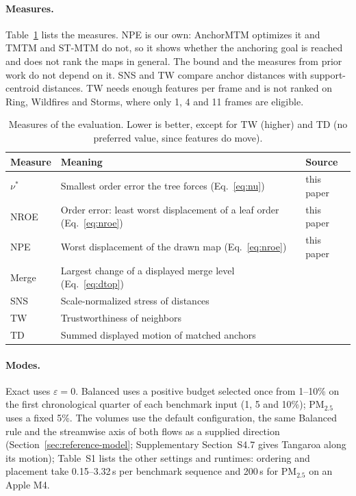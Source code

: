 \paragraph{Measures.} Table~\ref{tab:measures} lists the measures. NPE is our own: AnchorMTM optimizes it and TMTM and ST-MTM do not, so it shows whether the anchoring goal is reached and does not rank the maps in general. The bound and the measures from prior work do not depend on it. SNS and TW compare anchor distances with support-centroid distances. TW needs enough features per frame and is not ranked on Ring, Wildfires and Storms, where only 1, 4 and 11 frames are eligible.

\begin{table}[!tb]
\centering
\caption{Measures of the evaluation. Lower is better, except for TW (higher) and TD (no preferred value, since features do move).}
\label{tab:measures}
\footnotesize
\setlength{\tabcolsep}{3pt}
\renewcommand{\arraystretch}{0.95}
\begin{tabular}{@{}lp{}l@{}}
\toprule
Measure & Meaning & Source\\
\midrule
$\nu^*$ & Smallest order error the tree forces (Eq.~\ref{eq:nu}) & this paper\\
NROE & Order error: least worst displacement of a leaf order (Eq.~\ref{eq:nroe}) & this paper\\
NPE & Worst displacement of the drawn map (Eq.~\ref{eq:nroe}) & this paper\\
Merge & Largest change of a displayed merge level (Eq.~\ref{eq:dtop}) & \cite{Munch:2019:LINF}\\
SNS & Scale-normalized stress of distances & \cite{Smelser:2025:Scale}\\
TW & Trustworthiness of neighbors & \cite{Venna:2001:NP}\\
TD & Summed displayed motion of matched anchors & \cite{STMTM:2026}\\
\bottomrule
\end{tabular}
\end{table}

\paragraph{Modes.} Exact uses $\varepsilon=0$. Balanced uses a positive budget selected once from 1--10\% on the first chronological quarter of each benchmark input (1, 5 and 10\%); PM$_{2.5}$ uses a fixed 5\%. The volumes use the default configuration, the same Balanced rule and the streamwise axis of both flows as a supplied direction (Section~\ref{sec:reference-model}; Supplementary Section~S4.7 gives Tangaroa along its motion); Table~S1 lists the other settings and runtimes: ordering and placement take 0.15--3.32\,s per benchmark sequence and 200\,s for PM$_{2.5}$ on an Apple M4.

